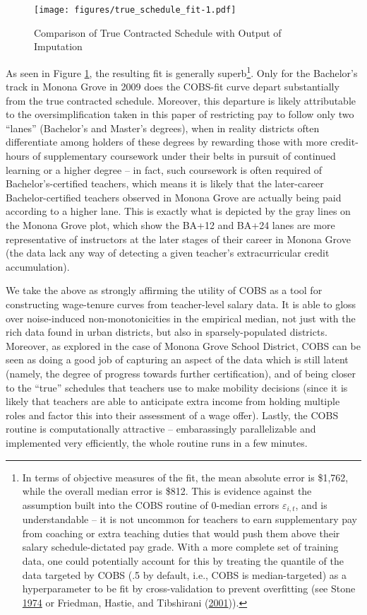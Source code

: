 \documentclass[12pt,]{article}
\let\rmarkdownfootnote\footnote%
\def\footnote{\protect\rmarkdownfootnote}
\begin{document}
\begin{figure}[htbp]
\centering
\texttt{[image: figures/true\_schedule\_fit-1.pdf]}
\caption{\label{fig:true_fit}Comparison of True Contracted Schedule with
Output of Imputation}
\end{figure}

As seen in Figure \ref{fig:true_fit}, the resulting fit is generally
superb\footnote{In terms of objective measures of the fit, the mean
  absolute error is \$1,762, while the overall median error is \$812.
  This is evidence against the assumption built into the COBS routine of
  0-median errors \(\varepsilon_{i, t}\), and is understandable -- it is
  not uncommon for teachers to earn supplementary pay from coaching or
  extra teaching duties that would push them above their salary
  schedule-dictated pay grade. With a more complete set of training
  data, one could potentially account for this by treating the quantile
  of the data targeted by COBS (.5 by default, i.e., COBS is
  median-targeted) as a hyperparameter to be fit by cross-validation to
  prevent overfitting (see Stone \protect\hyperlink{ref-stone}{1974} or
  Friedman, Hastie, and Tibshirani
  (\protect\hyperlink{ref-friedman}{2001})).}. Only for the Bachelor's
track in Monona Grove in 2009 does the COBS-fit curve depart
substantially from the true contracted schedule. Moreover, this
departure is likely attributable to the oversimplification taken in this
paper of restricting pay to follow only two ``lanes'' (Bachelor's and
Master's degrees), when in reality districts often differentiate among
holders of these degrees by rewarding those with more credit-hours of
supplementary coursework under their belts in pursuit of continued
learning or a higher degree -- in fact, such coursework is often
required of Bachelor's-certified teachers, which means it is likely that
the later-career Bachelor-certified teachers observed in Monona Grove
are actually being paid according to a higher lane. This is exactly what
is depicted by the gray lines on the Monona Grove plot, which show the
BA+12 and BA+24 lanes are more representative of instructors at the
later stages of their career in Monona Grove (the data lack any way of
detecting a given teacher's extracurricular credit accumulation).

We take the above as strongly affirming the utility of COBS as a tool
for constructing wage-tenure curves from teacher-level salary data. It
is able to gloss over noise-induced non-monotonicities in the empirical
median, not just with the rich data found in urban districts, but also
in sparsely-populated districts. Moreover, as explored in the case of
Monona Grove School District, COBS can be seen as doing a good job of
capturing an aspect of the data which is still latent (namely, the
degree of progress towards further certification), and of being closer
to the ``true'' schedules that teachers use to make mobility decisions
(since it is likely that teachers are able to anticipate extra income
from holding multiple roles and factor this into their assessment of a
wage offer). Lastly, the COBS routine is computationally attractive --
embarassingly parallelizable and implemented very efficiently, the whole
routine runs in a few minutes.
\end{document}
